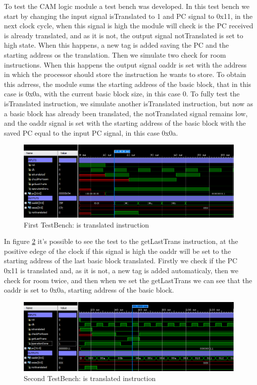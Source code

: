 
To test the CAM logic module a test bench was developed. In this test bench we start by changing the input signal isTranslated to 1 and PC signal to 0x11, in the next clock cycle, when this signal is high the module will check is the PC received is already translated, and as it is not, the output signal notTranslated is set to high state. When this happens, a new tag is added saving the PC and the starting address os the translation.
Then we simulate two check for room instructions. When this happens the output signal oaddr is set with the address in which the processor should store the instruction he wants to store. To obtain this adrress, the module sums the starting address of the basic block, that in this case is 0x0a, with the current basic block size, in this case 0.
To fully test the isTranslated instruction, we simulate another isTranslated instruction, but now as a basic block has already been translated, the notTranslated signal remains low, and the oaddr signal is set with the starting address of the basic block with the saved PC equal to the input PC signal, in this case 0x0a.

\begin{figure} [H]
	\centering
	\includegraphics[scale = 0.5]{Images/TestBench1.png}
	\caption{First TestBench: is translated instruction}
	\label{fig:TestBench1}
\end{figure}

In figure \ref{fig:TestBench4} it's possible to see the test to the getLastTrans instruction, at the positive edege of the clock if this signal is high the oaddr will be set to the starting address of the last basic block translated. Firstly we check if the PC 0x11 is translated and, as it is not, a new tag is added automaticaly, then we check for room twice, and then when we set the getLastTrans we can see that the oaddr is set to 0x0a, starting address of the basic block.

\begin{figure} [H]
	\centering
	\includegraphics[scale = 0.5]{Images/TestBench4.png}
	\caption{Second TestBench: is translated instruction}
	\label{fig:TestBench4}
\end{figure}

